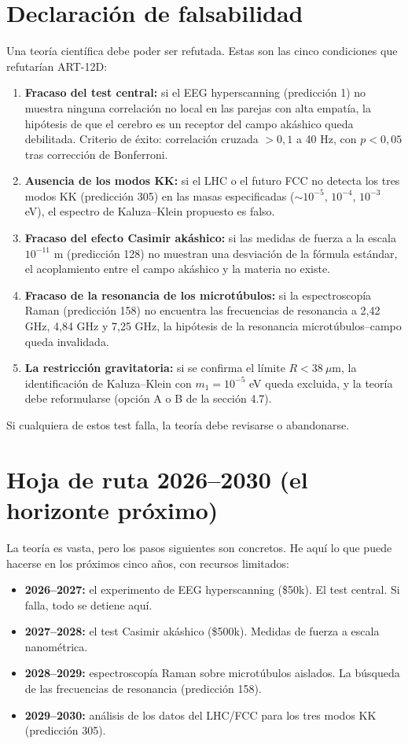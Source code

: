 \documentclass[11pt,a4paper]{article}
\begin{document}
\section{Declaración de falsabilidad}
Una teoría científica debe poder ser refutada. Estas son las cinco condiciones que refutarían ART-12D:
\begin{enumerate}
    \item \textbf{Fracaso del test central:} si el EEG hyperscanning (predicción 1) no muestra ninguna correlación no local en las parejas con alta empatía, la hipótesis de que el cerebro es un receptor del campo akáshico queda debilitada. Criterio de éxito: correlación cruzada $> 0,1$ a 40 Hz, con $p < 0,05$ tras corrección de Bonferroni.
    \item \textbf{Ausencia de los modos KK:} si el LHC o el futuro FCC no detecta los tres modos KK (predicción 305) en las masas especificadas ($\sim 10^{-5}$, $10^{-4}$, $10^{-3}$ eV), el espectro de Kaluza--Klein propuesto es falso.
    \item \textbf{Fracaso del efecto Casimir akáshico:} si las medidas de fuerza a la escala $10^{-11}$ m (predicción 128) no muestran una desviación de la fórmula estándar, el acoplamiento entre el campo akáshico y la materia no existe.
    \item \textbf{Fracaso de la resonancia de los microtúbulos:} si la espectroscopía Raman (predicción 158) no encuentra las frecuencias de resonancia a 2,42 GHz, 4,84 GHz y 7,25 GHz, la hipótesis de la resonancia microtúbulos--campo queda invalidada.
    \item \textbf{La restricción gravitatoria:} si se confirma el límite $R < 38\ \mu$m, la identificación de Kaluza--Klein con $m_1 = 10^{-5}$ eV queda excluida, y la teoría debe reformularse (opción A o B de la sección 4.7).
\end{enumerate}
Si cualquiera de estos test falla, la teoría debe revisarse o abandonarse.

\section{Hoja de ruta 2026--2030 (el horizonte próximo)}
La teoría es vasta, pero los pasos siguientes son concretos. He aquí lo que puede hacerse en los próximos cinco años, con recursos limitados:
\begin{itemize}
    \item \textbf{2026--2027:} el experimento de EEG hyperscanning (\$50k). El test central. Si falla, todo se detiene aquí.
    \item \textbf{2027--2028:} el test Casimir akáshico (\$500k). Medidas de fuerza a escala nanométrica.
    \item \textbf{2028--2029:} espectroscopía Raman sobre microtúbulos aislados. La búsqueda de las frecuencias de resonancia (predicción 158).
    \item \textbf{2029--2030:} análisis de los datos del LHC/FCC para los tres modos KK (predicción 305).
\end{itemize}
\end{document}
